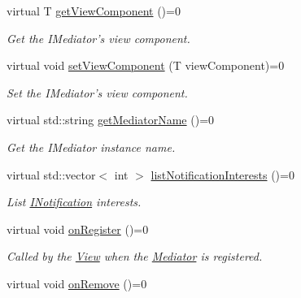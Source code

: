 \begin{DoxyCompactItemize}
\item 
virtual T \hyperlink{class_pure_m_v_c_1_1_i_mediator_templated_a985393a359ef8643a577b34e81374dc6}{getViewComponent} ()=0
\begin{DoxyCompactList}\small\item\em Get the {\ttfamily IMediator}'s view component. \item\end{DoxyCompactList}\item 
virtual void \hyperlink{class_pure_m_v_c_1_1_i_mediator_templated_a0eb50a31925283b7d6cdfe5b9dc90163}{setViewComponent} (T viewComponent)=0
\begin{DoxyCompactList}\small\item\em Set the {\ttfamily IMediator}'s view component. \item\end{DoxyCompactList}\item 
virtual std::string \hyperlink{class_pure_m_v_c_1_1_i_mediator_restricted_a763c71cd6446cb09c2eb55ad91ca28ca}{getMediatorName} ()=0
\begin{DoxyCompactList}\small\item\em Get the {\ttfamily IMediator} instance name. \item\end{DoxyCompactList}\item 
virtual std::vector$<$ int $>$ \hyperlink{class_pure_m_v_c_1_1_i_mediator_restricted_a9b9d790649480769697e1b3e7377c313}{listNotificationInterests} ()=0
\begin{DoxyCompactList}\small\item\em List {\ttfamily \hyperlink{class_pure_m_v_c_1_1_i_notification}{INotification}} interests. \item\end{DoxyCompactList}\item 
virtual void \hyperlink{class_pure_m_v_c_1_1_i_mediator_restricted_a1c9b8d32557fdf7c3b03c7b8a6c1bb05}{onRegister} ()=0
\begin{DoxyCompactList}\small\item\em Called by the \hyperlink{class_pure_m_v_c_1_1_view}{View} when the \hyperlink{class_pure_m_v_c_1_1_mediator}{Mediator} is registered. \item\end{DoxyCompactList}\item 
virtual void \hyperlink{class_pure_m_v_c_1_1_i_mediator_restricted_ae6e471d85f08ed86fae3b1e7377f8d69}{onRemove} ()=0

\end{DoxyCompactItemize}
